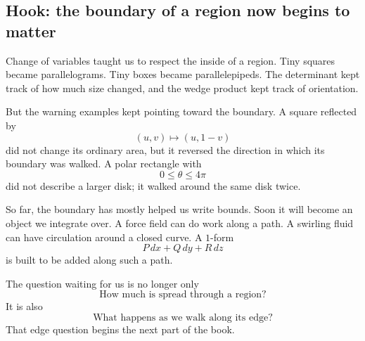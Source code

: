 \subsection{Hook: the boundary of a region now begins to matter}

Change of variables taught us to respect the inside of a region.  Tiny squares became
parallelograms.  Tiny boxes became parallelepipeds.  The determinant kept track of
how much size changed, and the wedge product kept track of orientation.

But the warning examples kept pointing toward the boundary.  A square reflected by
\[
    (u,v)\mapsto (u,1-v)
\]
did not change its ordinary area, but it reversed the direction in which its boundary was
walked.  A polar rectangle with
\[
    0\le\theta\le4\pi
\]
did not describe a larger disk; it walked around the same disk twice.

So far, the boundary has mostly helped us write bounds.  Soon it will become an object
we integrate over.  A force field can do work along a path.  A swirling fluid can have
circulation around a closed curve.  A \(1\)-form
\[
    P\,dx+Q\,dy+R\,dz
\]
is built to be added along such a path.

The question waiting for us is no longer only
\[
    \text{How much is spread through a region?}
\]
It is also
\[
    \text{What happens as we walk along its edge?}
\]
That edge question begins the next part of the book.
